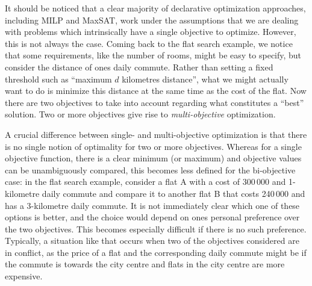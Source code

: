 It should be noticed that a clear majority of declarative optimization approaches, including MILP and MaxSAT, work under the assumptions that we are dealing with problems which intrinsically have a single objective to optimize.
However, this is not always the case.
Coming back to the flat search example, we notice that some requirements, like the number of rooms, might be easy to specify, but consider the distance of ones daily commute.
Rather than setting a fixed threshold such as ``maximum $d$ kilometres distance'', what we might actually want to do is minimize this distance at the same time as the cost of the flat.
Now there are two objectives to take into account regarding what constitutes a ``best'' solution.
Two or more objectives give rise to \emph{multi-objective} optimization.

A crucial difference between single- and multi-objective optimization is that there is no single notion of optimality for two or more objectives.
Whereas for a single objective function, there is a clear minimum (or maximum) and objective values can be unambiguously compared, this becomes less defined for the bi-objective case:
in the flat search example, consider a flat A with a cost of 300\,000 \texteuro{} and 1-kilometre daily commute and compare it to another flat B that costs 240\,000 \texteuro{} and has a 3-kilometre daily commute.
It is not immediately clear which one of these options is better, and the choice would depend on ones personal preference over the two objectives.
This becomes especially difficult if there is no such preference.
Typically, a situation like that occurs when two of the objectives considered are in conflict, as the price of a flat and the corresponding daily commute might be if the commute is towards the city centre and flats in the city centre are more expensive.

